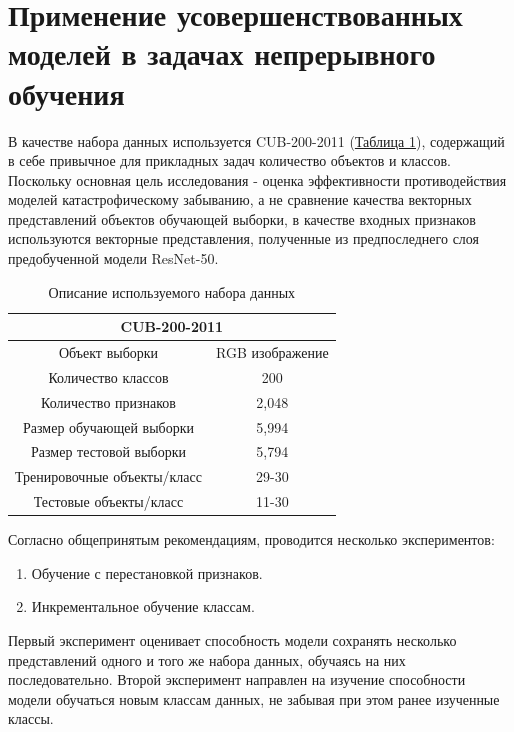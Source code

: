\documentclass[a4paper,14pt]{extarticle}
\begin{document}
\section{Применение усовершенствованных моделей в задачах непрерывного обучения}
В качестве набора данных используется CUB-200-2011 (\hyperref[tab:dataset]{Таблица 1}), содержащий в себе привычное для прикладных задач количество 
объектов и классов. Поскольку основная цель исследования - оценка эффективности 
противодействия моделей катастрофическому забыванию, а не сравнение качества 
векторных представлений объектов обучающей выборки, в качестве входных признаков
используются векторные представления, полученные из предпоследнего слоя
предобученной модели ResNet-50.
\begin{table}[h!]
    \begin{center}
        \begin{tabular}{ |c|c|  }
            \hline
            \multicolumn{2}{|c|}{CUB-200-2011} \\
            \hline
            Объект выборки & RGB изображение \\
            \hline
            Количество классов & 200 \\
            \hline
            Количество признаков & 2,048 \\
            \hline
            Размер обучающей выборки & 5,994 \\
            \hline
            Размер тестовой выборки & 5,794 \\
            \hline
            Тренировочные объекты/класс & 29-30 \\
            \hline
            Тестовые объекты/класс & 11-30 \\
            \hline
        \end{tabular}
        \caption{Описание используемого набора данных}
        \label{tab:dataset}
    \end{center}
\end{table}

Согласно общепринятым рекомендациям, проводится несколько экспериментов:
\begin{enumerate}
    \item Обучение с перестановкой признаков.
    \item Инкрементальное обучение классам.
\end{enumerate}
Первый эксперимент оценивает способность модели сохранять несколько 
представлений одного и того же набора данных, обучаясь на них последовательно.
Второй эксперимент направлен на изучение способности модели обучаться новым 
классам данных, не забывая при этом ранее изученные классы.
\end{document}
